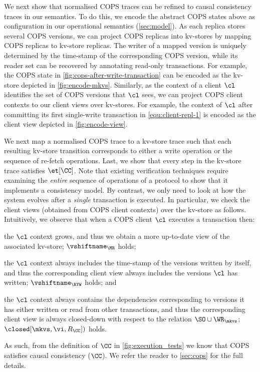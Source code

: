 We next show that normalised COPS traces can be refined to causal consistency traces in our semantics.
To do this, we encode the abstract COPS states above as configuration in our operational semantics (\cref{sec:model}). 
As each replica stores several COPS versions, 
we can project COPS replicas into kv-stores
by mapping COPS replicas to kv-store replicas.
The writer of a mapped version is uniquely
determined by the time-stamp of the corresponding COPS version, while
its reader set 
can be recovered by annotating read-only transactions.
For example, the COPS state in \cref{fig:cops-after-write-transaction} can be encoded as the kv-store depicted in \cref{fig:encode-mkvs}.
Similarly, as the context of a client $\cl$ identifies the set of COPS versions that $\cl$ sees, 
we can project COPS client contexts to our client views over kv-stores. 
For example, the context of \( \cl \) after committing its first single-write transaction in \eqref{equ:client-repl-1} is encoded as the client view depicted in \cref{fig:encode-view}.

We next map a normalised COPS trace to a kv-store trace such that each resulting 
kv-store transition corresponds 
to either a write operation or the sequence of re-fetch operations. 
Last, we show that every step in the kv-store trace satisfies \( \et[\CC] \).
Note that existing verification techniques \cite{framework-concur,seebelieve} require examining 
the \emph{entire} sequence of operations of a protocol to show that it implements a consistency model.
By contrast, we only need to look at how the system evolves after a \emph{single} transaction is executed.
In particular, we check the client views (obtained from COPS client contexts) over the kv-store as follows.
Intuitively, we observe that when a COPS client $\cl$ executes a transaction then:
\begin{enumerate*} 
\item the $\cl$ context grows, and thus we obtain a more up-to-date view of the associated kv-store; \ie $\vshiftname_{\MR}$ holds;
\item the $\cl$ context always includes the time-stamp of the versions written by itself, and thus the 
corresponding client view always includes the versions $\cl$ has written; \ie $\vshiftname_{\RYW}$ holds; and
\item the $\cl$ context always contains the dependencies corresponding to versions it has 
either written or read from other transactions, and thus the corresponding client view is always closed-down 
with respect to the relation $\SO \cup \WR_{\mkvs}$; \ie $\closed[\mkvs, \vi, R_{\CC}])$ holds.
\end{enumerate*}
As such, from the definition of $\CC$ in \cref{fig:execution_tests} we know that COPS satisfies causal consistency ($\CC$).
We refer the reader to \cref{sec:cops} for the full details.

